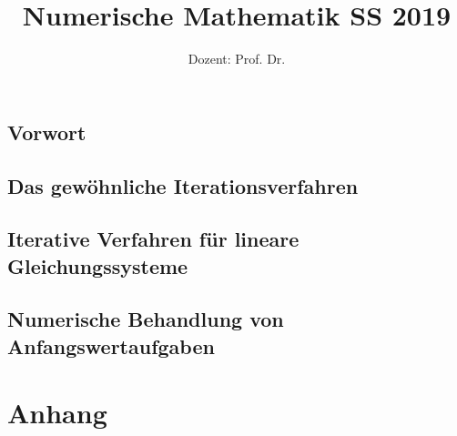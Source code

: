\documentclass[ngerman,a4paper,order=firstname]{../../texmf/tex/latex/mathscript/mathscript}
\title{\textbf{Numerische Mathematik SS 2019}}
\author{Dozent: Prof. Dr. \person{Andreas Fischer}}
\begin{document}
\pagestyle{plain}

\maketitle

\hypertarget{tocpage}{}
\tableofcontents
{}

\pagebreak
{}
\pagestyle{fancy}

\chapter*{Vorwort}


\chapter{Das gewöhnliche Iterationsverfahren}





\chapter{Iterative Verfahren für lineare Gleichungssysteme}



\chapter{Numerische Behandlung von Anfangswertaufgaben}







\part*{Anhang}
\appendix

\nocite{*}




\printindex
\end{document}
